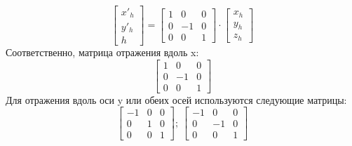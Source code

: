 \documentclass[a4paper, 14pt]{extarticle}
\begin{document}
$$
\begin{bmatrix}
	x'_h \\ y'_h \\ h
\end{bmatrix} = \begin{bmatrix}
	1 & 0 & 0 \\
	0 & -1 & 0 \\
	0 & 0 & 1
\end{bmatrix} \cdot \begin{bmatrix}
	x_h \\ y_h \\ z_h
\end{bmatrix}
$$
Соответственно, матрица отражения вдоль x: 
$$
\begin{bmatrix}
	1 & 0 & 0 \\
	0 & -1 & 0 \\
	0 & 0 & 1
\end{bmatrix}
$$
Для отражения вдоль оси y или обеих осей используются следующие матрицы:
$$
\begin{bmatrix}
	-1 & 0 & 0 \\
	0 & 1 & 0 \\
	0 & 0 & 1
\end{bmatrix}; \ 
\begin{bmatrix}
	-1 & 0 & 0 \\
	0 & -1 & 0 \\
	0 & 0 & 1
\end{bmatrix}
$$
\end{document}
